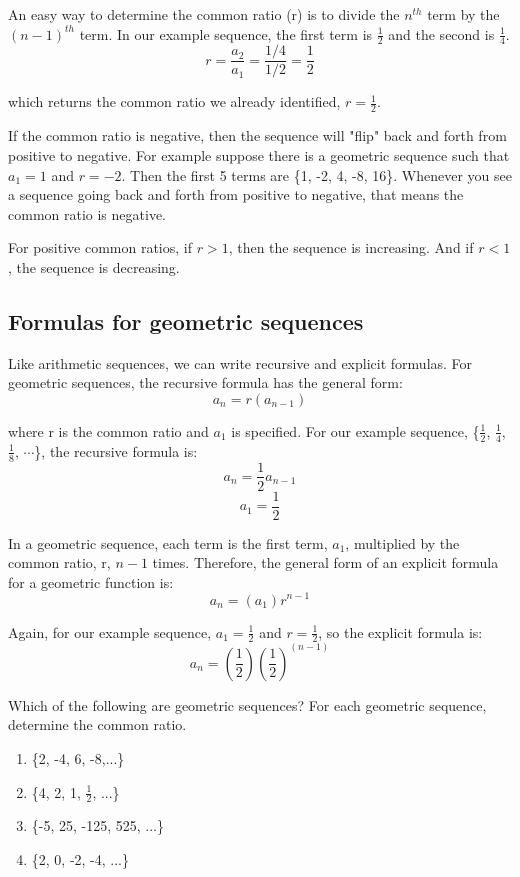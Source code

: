 An easy way to determine the common ratio (r) is to divide the 
$n^{th}$ term by the $(n-1)^{th}$ term. In our example sequence, 
the first term is $\frac{1}{2}$ and the second is $\frac{1}{4}$. 
$$r = \frac{a_2}{a_1} = \frac{1/4}{1/2} = \frac{1}{2}$$

which returns the common ratio we already identified, $r= \frac{1}{2}$. 

If the common ratio is negative, then the sequence will "flip" back 
and forth from positive to negative. For example suppose there is a 
geometric sequence such that $a_1 = 1$ and $r = -2$. Then the first 5 
terms are \{1, -2, 4, -8, 16\}. Whenever you see a sequence going 
back and forth from positive to negative, that means the common ratio 
is negative. 

For positive common ratios, if $r>1$, then the sequence is increasing. 
And if $r<1$, the sequence is decreasing. 

\subsection{Formulas for geometric sequences}
Like arithmetic sequences, we can write recursive and explicit 
formulas. For geometric sequences, the recursive formula has the 
general form: 
$$a_n = r(a_{n-1})$$

where r is the common ratio and $a_1$ is specified. For our example 
sequence, \{$\frac{1}{2}$, $\frac{1}{4}$, $\frac{1}{8}$, $\cdots$\}, 
the recursive formula is:
$$a_n = \frac{1}{2}a_{n-1}$$
$$a_1 = \frac{1}{2}$$

In a geometric sequence, each term is the first term, $a_1$, 
multiplied by the common ratio, r, $n-1$ times. Therefore, the 
general form of an explicit formula for a geometric function is:
$$a_n = (a_1)r^{n-1}$$

Again, for our example sequence, $a_1 = \frac{1}{2}$ and $r = 
\frac{1}{2}$, so the explicit formula is:
$$a_n = (\frac{1}{2})(\frac{1}{2})^{(n-1)}$$

\begin{Exercise}[label=seq4]
Which of the following are geometric sequences? For each geometric 
sequence, determine the common ratio.
\begin{enumerate}
\item \{2, -4, 6, -8,...\}
\item \{4, 2, 1, $\frac{1}{2}$, ...\}
\item \{-5, 25, -125, 525, ...\}
\item \{2, 0, -2, -4, ...\}
\end{enumerate}
\end{Exercise}

